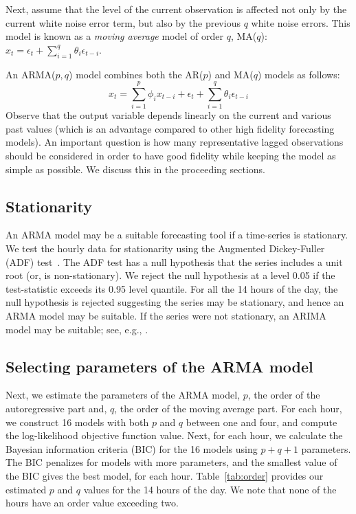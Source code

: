 \documentclass[letter]{IEEEtran}
\begin{document}
Next, assume that the level of the current observation is affected not only 
by the current white noise error term, but also by the previous 
$q$ white noise errors. This model is known as a \textit{moving average} 
model of order $q$, MA($q$): $x_t = \epsilon_t + \sum_{i=1}^q  \theta_i \epsilon_{t-i}$.

An ARMA($p,q$) model combines both the AR($p$) and MA($q$) models as follows:
\begin{equation}\label{eq3}
x_t =  \sum_{i=1}^p  \phi_i x_{t-i}    + \epsilon_t + \sum_{i=1}^q  \theta_i \epsilon_{t-i}   
\end{equation}
Observe that the output variable depends linearly on the current and various 
past values (which is an advantage compared to other high fidelity 
forecasting models). An important question is how many 
representative lagged observations should be considered in order to have good 
fidelity while keeping the model as simple as possible. We discuss this in the 
proceeding sections.



\subsection{Stationarity} \label{sec:stationarity}
An ARMA model may be a suitable forecasting tool if a time-series is 
stationary. We test 
the hourly data for stationarity using the Augmented 
Dickey-Fuller (ADF) test~\cite{dickey1979distribution}. The ADF test has a null 
hypothesis that the series includes a unit root (or, is non-stationary). We 
reject the null hypothesis at a level 0.05 if the test-statistic exceeds its 
0.95 level quantile. For all the 14 hours of the day, the null hypothesis is 
rejected suggesting the series may be stationary, and hence an ARMA model may 
be suitable. If the series were not stationary, an ARIMA model may be suitable; 
see, e.g., \cite{contreras2003arima}.

\subsection{Selecting parameters of the ARMA model} 
Next, we estimate the parameters of the ARMA model, $p$, the order of the 
autoregressive part and, $q$, the order of the moving average part. For each 
hour, we construct 16 models with both $p$ and $q$ between one and four, and 
compute 
the log-likelihood objective function value. Next, for each hour, we calculate 
the Bayesian information criteria (BIC) for the 16 models using $p + q + 1$ 
parameters.  The BIC penalizes for models with more parameters, and the 
smallest value of the BIC gives the best model, for each 
hour. Table~\ref{tab:order} provides our estimated $p$ and $q$  values for 
the 14 hours of the day. We note that none of the hours have an order value 
exceeding two.
\end{document}
